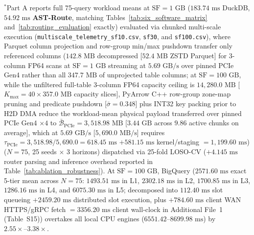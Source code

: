 \documentclass[10pt,a4paper]{article}
\newenvironment{fitasttable}{%
  \begin{lrbox}{\asttblbox}%
}{%
  \end{lrbox}%
  \sbox{\asttblboxB}{%
    \ifdim\wd\asttblbox>0.96\textwidth
      \resizebox{0.96\textwidth}{!}{\usebox{\asttblbox}}%
    \else
      \usebox{\asttblbox}%
    \fi
  }%
  \ifdim\ht\asttblboxB>0.72\textheight
    \resizebox{!}{0.72\textheight}{\usebox{\asttblboxB}}%
  \else
    \usebox{\asttblboxB}%
  \fi
}
\begin{document}
\begin{table}[!htbp]
\begin{fitasttable}
\begin{tabular}{@{}llcccccccl@{}}
\bottomrule
\end{tabular}
\end{fitasttable}%
\vspace{2pt}
\parbox{0.96\textwidth}{\scriptsize $^{*}$Part A reports full 75-query workload means at $\text{SF}=1\text{ GB}$ ($183.74\text{ ms}$ DuckDB, $54.92\text{ ms}$ \textbf{AST-Route}, matching Tables~\ref{tab:six_software_matrix} and~\ref{tab:routing_evaluation} exactly) evaluated via chunked multi-scale execution (\texttt{multiscale\_\allowbreak{}telemetry\_\allowbreak{}sf10.csv}, \texttt{sf30}, and \texttt{sf100.csv}), where Parquet column projection and row-group min/max pushdown transfer only referenced columns ($142.8\text{ MB}$ decompressed [$52.4\text{ MB}$ ZSTD Parquet] for 3-column FP64 scans at $\text{SF}=1\text{ GB}$ streaming at $5.69\text{ GB/s}$ over pinned PCIe Gen4 rather than all $347.7\text{ MB}$ of unprojected table columns; at $\text{SF}=100\text{ GB}$, while the unfiltered full-table 3-column FP64 capacity ceiling is $14{,}280.0\text{ MB}$ [$K_{\max}=40 \times 357.0\text{ MB}$ capacity slices], PyArrow C++ row-group zone-map pruning and predicate pushdown [$\bar{\sigma}=0.348$] plus INT32 key packing prior to H2D DMA reduce the workload-mean physical payload transferred over pinned PCIe Gen4 $\times 4$ to $\bar{\mathcal{B}}_{\text{PCIe}}=3{,}518.98\text{ MB}$ [$3.44\text{ GB}$ across $9.86$ active chunks on average], which at $5.69\text{ GB/s}$ [$5{,}690.0\text{ MB/s}$] requires $\tau_{\text{PCIe}} = 3{,}518.98 / 5{,}690.0 = 618.45\text{ ms}$ $+ 581.15\text{ ms}$ kernel/staging $= 1{,}199.60\text{ ms}$) ($N=75$, 25 seeds $\times$ 3 horizons) dispatched via 25-fold LOSO-CV ($+4.145\text{ ms}$ router parsing and inference overhead reported in Table~\ref{tab:ablation_robustness}). At $\text{SF}=100\text{ GB}$, BigQuery ($2571.60\text{ ms}$ exact 5-tier mean across $N=75$: $1493.51\text{ ms}$ in L1, $2302.18\text{ ms}$ in L2, $1700.85\text{ ms}$ in L3, $1286.16\text{ ms}$ in L4, and $6075.30\text{ ms}$ in L5; decomposed into $112.40\text{ ms}$ slot queueing $+ 2459.20\text{ ms}$ distributed slot execution, plus $+784.60\text{ ms}$ client WAN HTTPS/gRPC fetch $= 3356.20\text{ ms}$ client wall-clock in Additional File~1 (Table~S15)) overtakes all local CPU engines ($6551.42\text{--}8699.98\text{ ms}$) by $\mathbf{2.55\times\text{--}3.38\times}$.}
\end{table}

\end{document}
